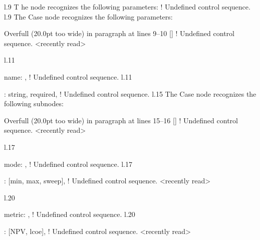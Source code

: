 l.9   T
       he  node recognizes the following parameters:
! Undefined control sequence.
l.9   The \xmlNode
                  {Case} node recognizes the following parameters:

Overfull \hbox (20.0pt too wide) in paragraph at lines 9--10
[]
! Undefined control sequence.
<recently read> \xmlAttr 
                         
l.11       \item \xmlAttr
                         {name}: ,
! Undefined control sequence.
l.11       \item {}: \xmlDesc
                                         {string, required},
! Undefined control sequence.
l.15   The \xmlNode
                   {Case} node recognizes the following subnodes:

Overfull \hbox (20.0pt too wide) in paragraph at lines 15--16
[]
! Undefined control sequence.
<recently read> \xmlNode 
                         
l.17     \item \xmlNode
                       {mode}: ,
! Undefined control sequence.
l.17     \item {}: \xmlDesc
                                       {[min, max, sweep]},
! Undefined control sequence.
<recently read> \xmlNode 
                         
l.20     \item \xmlNode
                       {metric}: ,
! Undefined control sequence.
l.20     \item {}: \xmlDesc
                                         {[NPV, lcoe]},
! Undefined control sequence.
<recently read> \xmlNode 
                         
